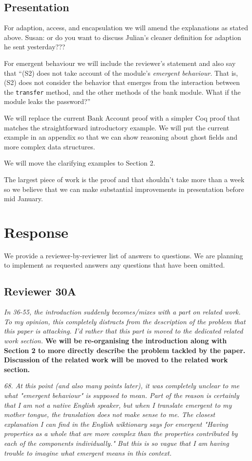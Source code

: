 \documentclass[11pt]{amsart}
\newcommand{\rev}[1]{\emph #1}
\newcommand{\us}[1]{\bf #1}
\begin{document}
 \subsection*{Presentation}
 
 For adaption, access, and encapsulation we will amend the explanations as stated above. Susan: or do you want to discuss Julian's cleaner definition for adaption he sent yesterday???
 
 For emergent behaviour we will include the reviewer's statement and also say that ``(S2) does not take account of the module's \emph{emergent behaviour}. That is, (S2) does not consider the behavior that emerges from the interaction between the 
\texttt{transfer} method, and the other methods of the bank module. What if the module leaks the password?''
 
 We will replace the current Bank Account proof with a simpler Coq proof that matches the straightforward introductory example. We will put the current example in an appendix so that we can 
show reasoning about ghost fields and more complex data structures. 

We will move the clarifying examples to Section 2.

The largest piece of work is the proof and that shouldn't take more than a week so we believe that we can make substantial improvements in presentation before mid January.

  
\section{Response} We provide a reviewer-by-reviewer list of answers to questions. We are planning to implement as requested answers any questions that have been omitted.
  
  \subsection*{Reviewer 30A}
  
{\rev {{In 36-55, the introduction suddenly becomes/mixes with a part on related work. To my opinion, this completely distracts from the description of the problem that this paper is attacking. I'd rather that this part is moved to the dedicated related work section.}}}
{\us{{We will be re-organising the introduction along with Section 2 to more directly describe the problem tackled by the paper. Discussion of the related work will be moved to the related work section.}}}

{\rev {{ 68. At this point (and also many points later), it was completely unclear to me what "emergent behaviour" is supposed to mean. Part of the reason is certainly that I am not a native English speaker, but when I translate emergent to my mother tongue, the translation does not make sense to me. The closest explanation I can find in the English wiktionary says for emergent "Having properties as a whole that are more complex than the properties contributed by each of the components individually." But this is so vague that I am having trouble to imagine what emergent means in this context.}}}
\end{document}
